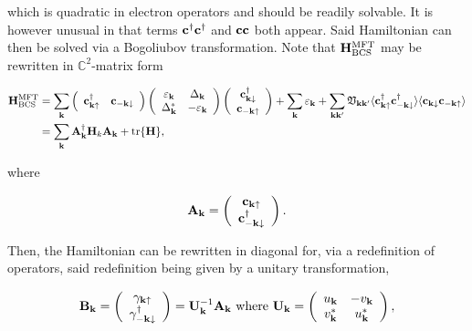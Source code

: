 \documentclass{homework}
\begin{document}
which is quadratic in electron operators and should be readily solvable. It is however unusual in that terms ${\bf c}^\dagger {\bf c}^\dagger$ and ${\bf c} {\bf c}$ both appear. Said Hamiltonian can then be solved via a Bogoliubov transformation. Note that ${\bf H}_{\textnormal{BCS}}^{\textnormal{MFT}}$ may be rewritten in $\mathds{C}^2$-matrix form 

\begin{equation}
\begin{split}
    {\bf H}_{\textnormal{BCS}}^{\textnormal{MFT}} &= \sum_{{\bf k}} \left( \begin{array}{cc}
        {\bf c}_{{\bf k}\uparrow}^\dagger & {\bf c}_{-{\bf k}\downarrow} \\ 
    \end{array} \right) \left(\begin{array}{cc}
        \varepsilon_{\bf k} &  \Delta_{{\bf k}}\\
        \Delta_{{\bf k}}^* & -\varepsilon_{\bf k}
    \end{array} \right) \left( \begin{array}{c}
        {\bf c}_{{\bf k}\downarrow}^\dagger \\
        {\bf c}_{-{\bf k}\uparrow} 
    \end{array} \right) + \sum_{{\bf k}} \varepsilon_{{\bf k}} + \sum_{{\bf k} {\bf k'}} \mathfrak{V}_{{\bf k} {\bf k'}} \langle {\bf c}_{{\bf k} \uparrow}^\dagger {\bf c}_{-{\bf k} \downarrow}^\dagger \rangle \langle {\bf c}_{{\bf k} \downarrow} {\bf c}_{-{\bf k} \uparrow} \rangle \\
    &= \sum_{{\bf k}} {\bf A}_{{\bf k}}^\dagger {\bf H}_k {\bf A}_{{\bf k}} + \tr {\bf H},
\end{split}
\end{equation}

where 

$$
{\bf A}_{\bf k} = \left( \begin{array}{c}
     {\bf c}_{{\bf k}\uparrow}  \\
     {\bf c}_{-{\bf k}\downarrow}^\dagger  
\end{array} \right).
$$

Then, the Hamiltonian can be rewritten in diagonal for, via a redefinition of operators, said redefinition being given by a unitary transformation,

\begin{align}
    {\bf B}_{{\bf k}} = \left( \begin{array}{c}
     {\gamma}_{{\bf k}\uparrow}  \\
     {\gamma}_{-{\bf k}\downarrow}^\dagger  
\end{array} \right) = {\bf U}_{{\bf k}}^{-1} {\bf A}_{\bf k} \textnormal{ where } {\bf U}_{\bf k} = \left( \begin{array}{cc}
    u_{{\bf k}} & -v_{{\bf k}} \\
    v_{{\bf k}}^* & u_{{\bf k}}^*
\end{array} \right),
\end{align}
\end{document}
